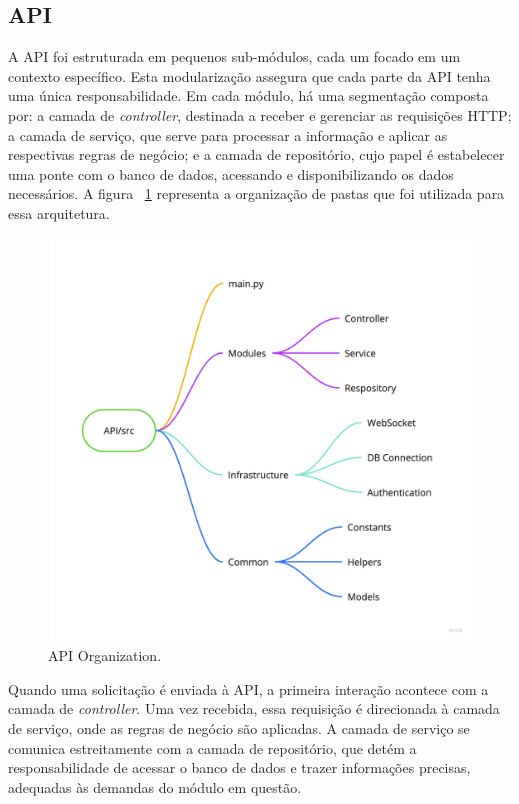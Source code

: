 \subsection{API}
A API foi estruturada em pequenos sub-módulos, cada um focado em um contexto específico. Esta modularização assegura que cada parte da API tenha uma única responsabilidade. Em cada módulo, há uma segmentação composta por: a camada de \textit{controller}, destinada a receber e gerenciar as requisições HTTP; a camada de serviço, que serve para processar a informação e aplicar as respectivas regras de negócio; e a camada de repositório, cujo papel é estabelecer uma ponte com o banco de dados, acessando e disponibilizando os dados necessários. A figura ~\ref{fig:api_organization} representa a organização de pastas que foi utilizada para essa arquitetura.

\begin{figure}[htbp]
	\centering
	\includegraphics[width=\textwidth]{images/API_Organization.jpg}
	\caption{API Organization.}
	\label{fig:api_organization}
\end{figure}

Quando uma solicitação é enviada à API, a primeira interação acontece com a camada de \textit{controller}. Uma vez recebida, essa requisição é direcionada à camada de serviço, onde as regras de negócio são aplicadas. A camada de serviço se comunica estreitamente com a camada de repositório, que detém a responsabilidade de acessar o banco de dados e trazer informações precisas, adequadas às demandas do módulo em questão.

